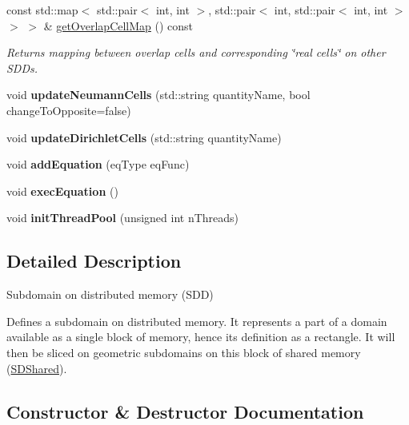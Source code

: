 \begin{DoxyCompactItemize}
const std\+::map$<$ std\+::pair$<$ int, int $>$, std\+::pair$<$ int, std\+::pair$<$ int, int $>$ $>$ $>$ \& \hyperlink{classSDDistributed_a2a2e744edad326561e3555a352ce4a0a}{get\+Overlap\+Cell\+Map} () const
\begin{DoxyCompactList}\small\item\em Returns mapping between overlap cells and corresponding \char`\"{}real cells\char`\"{} on other S\+D\+Ds. \end{DoxyCompactList}\item 
\mbox{\label{classSDDistributed_a492c6799b5b1f79481a2ee6e50979a18}} 
void {\bfseries update\+Neumann\+Cells} (std\+::string quantity\+Name, bool change\+To\+Opposite=false)
\item 
\mbox{\label{classSDDistributed_a0eaa89db3fd4b663d887de8dcf9f65af}} 
void {\bfseries update\+Dirichlet\+Cells} (std\+::string quantity\+Name)
\item 
\mbox{\label{classSDDistributed_a4c8dc37fa1d0991f0b883563df329518}} 
void {\bfseries add\+Equation} (eq\+Type eq\+Func)
\item 
\mbox{\label{classSDDistributed_a083335cd910b0818fb0990873b4e1f87}} 
void {\bfseries exec\+Equation} ()
\item 
\mbox{\label{classSDDistributed_a75660cf18d7248ac64e86ab457061b91}} 
void {\bfseries init\+Thread\+Pool} (unsigned int n\+Threads)
\end{DoxyCompactItemize}


\subsection{Detailed Description}
Subdomain on distributed memory (S\+DD) 

Defines a subdomain on distributed memory. It represents a part of a domain available as a single block of memory, hence its definition as a rectangle. It will then be sliced on geometric subdomains on this block of shared memory (\hyperlink{classSDShared}{S\+D\+Shared}). 

\subsection{Constructor \& Destructor Documentation}
\mbox{\label{classSDDistributed_a4ba8b15a2b28fcbf04d3665075918510}} 

